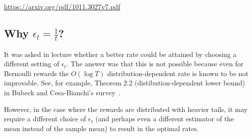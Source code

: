 \documentclass[11pt]{article}
\begin{document}
\url{https://arxiv.org/pdf/1011.3027v7.pdf}

\subsection{Why $\epsilon_t = \frac{1}{t}$?}
It was asked in lecture whether a better rate could be attained by choosing a different setting of $\epsilon_t$. The answer was that this is not possible because even for Bernoulli rewards the $O(\log T)$ distribution-dependent rate is known to 
be not improvable. See, for example, Theorem 2.2 (distibution-dependent lower bound) in Bubeck and Cesa-Bianchi's survey~\cite{bubeck2012regret}.
 
However, in the case where the rewards are distributed with heavier tails, it may require a different choice of $\epsilon_t$ (and perhaps even a different estimator of the mean instead of the sample mean) to result in the optimal rates.


\end{document}
